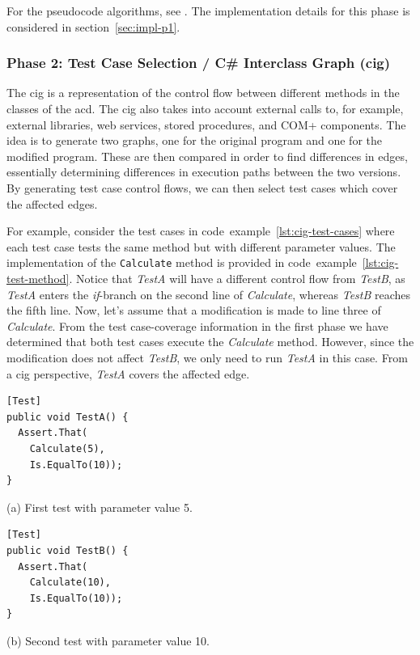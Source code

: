 \documentclass[a4paper,english,12pt]{report}
\newcommand{\textcf}{\texttt}
\begin{document}
For the pseudocode algorithms, see \citet[pp. 4-5]{mansour2009regression}. The implementation details for this phase is considered in section~\ref{sec:impl-p1}.

\subsubsection{Phase 2: Test Case Selection / C\# Interclass Graph (\gls{cig})}
The \gls{cig} is a representation of the control flow between different methods in the classes of the \gls{acd}. The \gls{cig} also takes into account external calls to, for example, external libraries, web services, stored procedures, and COM+ components. The idea is to generate two graphs, one for the original program and one for the modified program. These are then compared in order to find differences in edges, essentially determining differences in execution paths between the two versions. By generating test case control flows, we can then select test cases which cover the affected edges. 

For example, consider the test cases in code~example~\ref{lst:cig-test-cases} where each test case tests the same method but with different parameter values. The implementation of the \textcf{Calculate} method is provided in code~example~\vref{lst:cig-test-method}. Notice that \textit{TestA} will have a different control flow from \textit{TestB}, as \textit{TestA} enters the \textit{if}-branch on the second line of \textit{Calculate}, whereas \textit{TestB} reaches the fifth line. Now, let's assume that a modification is made to line three of \textit{Calculate}. From the test case-coverage information in the first phase we have determined that both test cases execute the \textit{Calculate} method. However, since the modification does not affect \textit{TestB}, we only need to run \textit{TestA} in this case. From a \gls{cig} perspective, \textit{TestA} covers the affected edge.

\begingroup
\captionsetup{type=listing}
\begin{multicols}{2}
\noindent
{\footnotesize
\begin{verbatim}
[Test]
public void TestA() {
  Assert.That(
    Calculate(5), 
    Is.EqualTo(10));
}
\end{verbatim}
(a) First test with parameter value 5.
}

\columnbreak
\noindent
{\footnotesize
\begin{verbatim}
[Test]
public void TestB() {
  Assert.That(
    Calculate(10), 
    Is.EqualTo(10));
}
\end{verbatim}
(b) Second test with parameter value 10.
}
\end{multicols}
\label{lst:cig-test-cases}
\endgroup
\end{document}
